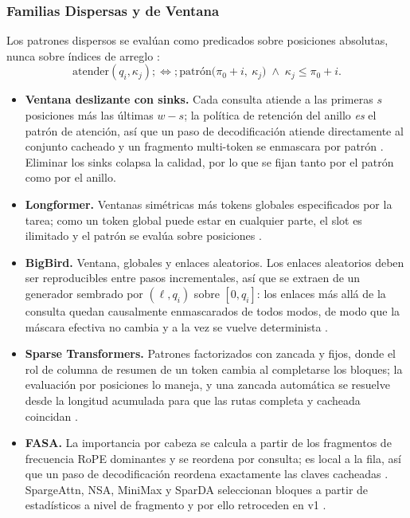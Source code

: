 \subsubsection{Familias Dispersas y de Ventana}

Los patrones dispersos se evalúan como predicados sobre posiciones absolutas, nunca sobre índices de arreglo \citep{child_sparse_transformer_2019}:
\[
\text{atender}(q_i,\kappa_j) ;\Longleftrightarrow; \text{patrón}\big(\pi_0+i,\ \kappa_j\big) \;\wedge\; \kappa_j \le \pi_0+i .
\]

\begin{itemize}[leftmargin=*]
    \item \textbf{Ventana deslizante con sinks.} Cada consulta atiende a las primeras $s$ posiciones más las últimas $w-s$; la política de retención del anillo \emph{es} el patrón de atención, así que un paso de decodificación atiende directamente al conjunto cacheado y un fragmento multi-token se enmascara por patrón \citep{jolicoeur_sliding_window_2026,xiao_streaming_sinks_2024}. Eliminar los sinks colapsa la calidad, por lo que se fijan tanto por el patrón como por el anillo.
    \item \textbf{Longformer.} Ventanas simétricas más tokens globales especificados por la tarea; como un token global puede estar en cualquier parte, el slot es ilimitado y el patrón se evalúa sobre posiciones \citep{beltagy_longformer_2020}.
    \item \textbf{BigBird.} Ventana, globales y enlaces aleatorios. Los enlaces aleatorios deben ser reproducibles entre pasos incrementales, así que se extraen de un generador sembrado por $(\ell, q_i)$ sobre $[0, q_i]$: los enlaces más allá de la consulta quedan causalmente enmascarados de todos modos, de modo que la máscara efectiva no cambia y a la vez se vuelve determinista \citep{zaheer_bigbird_2020}.
    \item \textbf{Sparse Transformers.} Patrones factorizados con zancada y fijos, donde el rol de columna de resumen de un token cambia al completarse los bloques; la evaluación por posiciones lo maneja, y una zancada automática se resuelve desde la longitud acumulada para que las rutas completa y cacheada coincidan \citep{child_sparse_transformer_2019}.
    \item \textbf{FASA.} La importancia por cabeza se calcula a partir de los fragmentos de frecuencia RoPE dominantes y se reordena por consulta; es local a la fila, así que un paso de decodificación reordena exactamente las claves cacheadas \citep{wang_fasa_2026}. SpargeAttn, NSA, MiniMax y SparDA seleccionan bloques a partir de estadísticos a nivel de fragmento y por ello retroceden en v1 \citep{zhang_spargeattn_2025,yuan_nsa_2025,lai_minimax_2026,fu_sparda_2026}.

\end{itemize}

